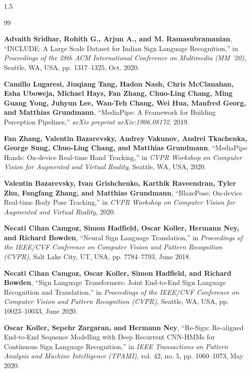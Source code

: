\renewcommand{\bibname}{REFERENCES}
\cleardoublepage %
\begin{spacing}{1.5}
\begin{thebibliography}{99}

 \textbf{Advaith Sridhar, Rohith G., Arjun A., and M. Ramasubramanian}, ``INCLUDE: A Large Scale Dataset for Indian Sign Language Recognition,'' in \textit{Proceedings of the 28th ACM International Conference on Multimedia (MM '20)}, Seattle, WA, USA, pp. 1317--1325, Oct. 2020.

 \textbf{Camillo Lugaresi, Jiuqiang Tang, Hadon Nash, Chris McClanahan, Esha Uboweja, Michael Hays, Fan Zhang, Chuo-Ling Chang, Ming Guang Yong, Juhyun Lee, Wan-Teh Chang, Wei Hua, Manfred Georg, and Matthias Grundmann}, ``MediaPipe: A Framework for Building Perception Pipelines,'' \textit{arXiv preprint arXiv:1906.08172}, 2019.

 \textbf{Fan Zhang, Valentin Bazarevsky, Andrey Vakunov, Andrei Tkachenka, George Sung, Chuo-Ling Chang, and Matthias Grundmann}, ``MediaPipe Hands: On-device Real-time Hand Tracking,'' in \textit{CVPR Workshop on Computer Vision for Augmented and Virtual Reality}, Seattle, WA, USA, 2020.

 \textbf{Valentin Bazarevsky, Ivan Grishchenko, Karthik Raveendran, Tyler Zhu, Fangfang Zhang, and Matthias Grundmann}, ``BlazePose: On-device Real-time Body Pose Tracking,'' in \textit{CVPR Workshop on Computer Vision for Augmented and Virtual Reality}, 2020.

 \textbf{Necati Cihan Camgoz, Simon Hadfield, Oscar Koller, Hermann Ney, and Richard Bowden}, ``Neural Sign Language Translation,'' in \textit{Proceedings of the IEEE/CVF Conference on Computer Vision and Pattern Recognition (CVPR)}, Salt Lake City, UT, USA, pp. 7784--7793, June 2018.

 \textbf{Necati Cihan Camgoz, Oscar Koller, Simon Hadfield, and Richard Bowden}, ``Sign Language Transformers: Joint End-to-End Sign Language Recognition and Translation,'' in \textit{Proceedings of the IEEE/CVF Conference on Computer Vision and Pattern Recognition (CVPR)}, Seattle, WA, USA, pp. 10023--10033, June 2020.

 \textbf{Oscar Koller, Sepehr Zargaran, and Hermann Ney}, ``Re-Sign: Re-aligned End-to-End Sequence Modelling with Deep Recurrent CNN-HMMs for Continuous Sign Language Recognition,'' in \textit{IEEE Transactions on Pattern Analysis and Machine Intelligence (TPAMI)}, vol. 42, no. 5, pp. 1060--1073, May 2020.


\end{thebibliography}
\end{spacing}
